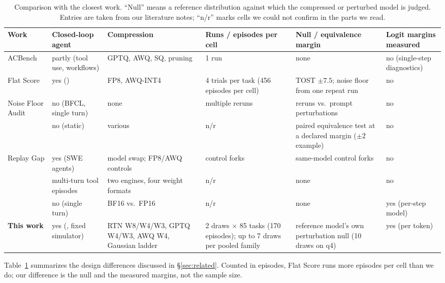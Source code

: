 \begin{table}[t]
\centering
\footnotesize
\setlength{\tabcolsep}{3pt}
\begin{tabular}{@{}p{2.4cm}p{2.2cm}p{2.7cm}p{2.7cm}p{2.9cm}p{1.9cm}@{}}
\toprule
Work & Closed-loop agent & Compression & Runs / episodes per cell & Null / equivalence margin & Logit margins measured \\
\midrule
ACBench \citeyearpar{dong2025acbench} & partly (tool use, workflows) & GPTQ, AWQ, SQ, pruning & 1 run & none & no (single-step diagnostics) \\
Flat Score \citeyearpar{jang2026flat} & yes (\tautwo{}) & FP8, AWQ-INT4 & 4 trials per task (456 episodes per cell) & TOST $\pm 7.5$\pp{}; noise floor from one repeat run & no \\
Noise Floor Audit \citeyearpar{chen2026noisefloor} & no (BFCL, single turn) & none & multiple reruns & reruns vs.\ prompt perturbations & no \\
\citet{singh2026certifying} & no (static) & various & n/r & paired equivalence test at a declared margin ($\pm 2$\pp{} example) & no \\
Replay Gap \citeyearpar{gonuguntla2026replay} & yes (SWE agents) & model swap; FP8/AWQ controls & control forks & same-model control forks & no \\
\citet{patodiya2026same} & multi-turn tool episodes & two engines, four weight formats & n/r & none & no \\
\citet{du2026greedy} & no (single turn) & BF16 vs.\ FP16 & n/r & none & yes (per-step model) \\
\textbf{This work} & yes (\tautwo{}, fixed simulator) & RTN W8/W4/W3, GPTQ W4/W3, AWQ W4, Gaussian ladder & 2 draws $\times$ 85 tasks (170 episodes); up to 7 draws per pooled family & reference model's own perturbation null (10 draws on q4) & yes (per token) \\
\bottomrule
\end{tabular}
\caption{Comparison with the closest work. ``Null'' means a reference distribution against which the compressed or perturbed model is judged. Entries are taken from our literature notes; ``n/r'' marks cells we could not confirm in the parts we read.}
\label{tab:comparison}
\end{table}

Table~\ref{tab:comparison} summarizes the design differences discussed in \S\ref{sec:related}. Counted in episodes, Flat Score runs more episodes per cell than we do; our difference is the null and the measured margins, not the sample size.

